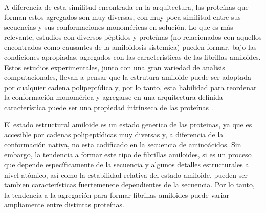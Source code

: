 A diferencia de esta similitud encontrada en la arquitectura, las proteínas que forman estos agregados son muy diversas, con muy poca similitud entre sus secuencias y sus conformaciones monoméricas en solución.
Lo que es más relevante, estudios con diversos péptidos y proteínas (no relacionados con aquellos encontrados como causantes de la amiloidosis sistemica) pueden formar, bajo las condiciones apropiadas, agregados con las 
características de las fibrillas amiloides.
Estos estudios experimentales, junto con una gran variedad de analisis computacionales, llevan a pensar que la estrutura amiloide puede ser adoptada por cualquier cadena polipeptídica y, por lo tanto, 
esta habilidad para reordenar la conformación monomérica y agregarse en una arquitectura definida característica puede ser una propiedad intrínseca de las proteínas
\cite{fandrich2002behaviour}.

El estado estructural amiloide es un estado generico de las proteinas, ya que es accesible por cadenas polipeptídicas muy diversas y, a diferencia de la conformación nativa, no esta codificado en la secuencia de aminoácidos.
Sin embargo, la tendencia a formar este tipo de fibrillas amiloides, si es un proceso que depende específicamente de la secuencia y algunos detalles estructurales a nivel atómico, así como la estabilidad relativa del estado amiloide, 
pueden ser tambien características fuertemenete dependientes de la secuencia.  
Por lo tanto, la tendencia a la agregación para formar fibrillas amiloides puede variar ampliamente entre distintas proteínas. 

